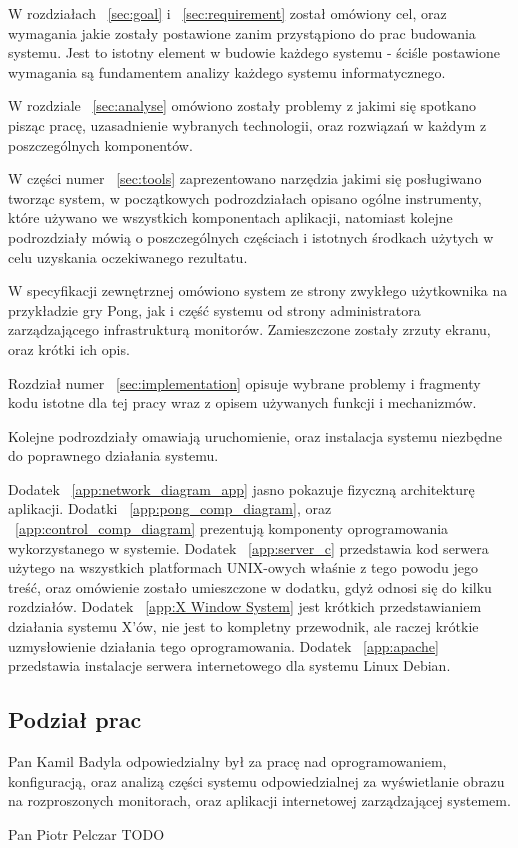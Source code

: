 W rozdziałach ~\ref{sec:goal} i ~\ref{sec:requirement} został omówiony cel, oraz wymagania jakie zostały postawione zanim przystąpiono do prac budowania systemu. Jest to istotny element w budowie każdego systemu - ściśle postawione wymagania są fundamentem analizy każdego systemu informatycznego.

\par
W rozdziale ~\ref{sec:analyse} omówiono zostały problemy z jakimi się spotkano pisząc pracę, uzasadnienie wybranych technologii, oraz rozwiązań w każdym z poszczególnych komponentów. 

\par

W części numer ~\ref{sec:tools} zaprezentowano narzędzia jakimi się posługiwano tworząc system, w początkowych podrozdziałach opisano ogólne instrumenty, które używano we wszystkich komponentach aplikacji, natomiast kolejne podrozdziały mówią o poszczególnych częściach i istotnych środkach użytych w celu uzyskania oczekiwanego rezultatu.

\par

W specyfikacji zewnętrznej omówiono system ze strony zwykłego użytkownika na przykładzie gry Pong, jak i część systemu od strony administratora zarządzającego infrastrukturą monitorów. Zamieszczone zostały zrzuty ekranu, oraz krótki ich opis.

\par

Rozdział numer ~\ref{sec:implementation} opisuje wybrane problemy i fragmenty kodu istotne dla tej pracy wraz z opisem używanych funkcji i mechanizmów.

\par

Kolejne podrozdziały omawiają uruchomienie, oraz instalacja systemu niezbędne do poprawnego działania systemu. 

\par

Dodatek ~\ref{app:network_diagram_app} jasno pokazuje fizyczną architekturę aplikacji.
Dodatki ~\ref{app:pong_comp_diagram}, oraz ~\ref{app:control_comp_diagram} prezentują komponenty oprogramowania wykorzystanego w systemie.
Dodatek ~\ref{app:server_c} przedstawia kod serwera użytego na wszystkich platformach UNIX-owych właśnie z tego powodu jego treść, oraz omówienie zostało umieszczone w dodatku, gdyż odnosi się do kilku rozdziałów.
Dodatek ~\ref{app:X Window System} jest krótkich przedstawianiem działania systemu X'ów, nie jest to kompletny przewodnik, ale raczej krótkie uzmysłowienie działania tego oprogramowania.
Dodatek ~\ref{app:apache} przedstawia instalacje serwera internetowego dla systemu Linux Debian. 

\subsection{Podział prac}

Pan Kamil Badyla odpowiedzialny był za pracę nad oprogramowaniem, konfiguracją, oraz analizą części systemu odpowiedzialnej za wyświetlanie obrazu na rozproszonych monitorach, oraz aplikacji internetowej zarządzającej systemem.

Pan Piotr Pelczar TODO
